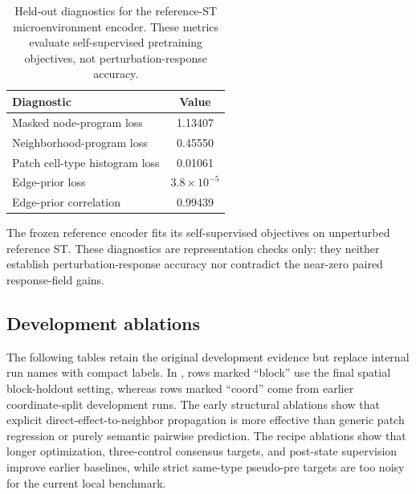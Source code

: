 \documentclass[sigconf,review,balance=false]{acmart}
\begin{document}
\begin{table}[t]
\centering
\caption{Held-out diagnostics for the reference-ST microenvironment encoder. These metrics evaluate self-supervised pretraining objectives, not perturbation-response accuracy.}
\label{tab:app_organ_prior}
\small
\setlength{\tabcolsep}{8pt}
\renewcommand{\arraystretch}{1.12}
\begin{tabular}{lc}
\toprule
Diagnostic & Value \\
\midrule
Masked node-program loss & 1.13407 \\
Neighborhood-program loss & 0.45550 \\
Patch cell-type histogram loss & 0.01061 \\
Edge-prior loss & $3.8\times10^{-5}$ \\
Edge-prior correlation & 0.99439 \\
\bottomrule
\end{tabular}
\end{table}

The frozen reference encoder fits its self-supervised objectives on
unperturbed reference ST. These diagnostics are representation checks only:
they neither establish perturbation-response accuracy nor contradict the
near-zero paired response-field gains.

\subsection{Development ablations}
\label{app:development_ablations}

The following tables retain the original development evidence but replace internal run names with compact labels. In , rows marked ``block'' use the final spatial block-holdout setting, whereas rows marked ``coord'' come from earlier coordinate-split development runs. The early structural ablations show that explicit direct-effect-to-neighbor propagation is more effective than generic patch regression or purely semantic pairwise prediction. The recipe ablations show that longer optimization, three-control consensus targets, and post-state supervision improve earlier baselines, while strict same-type pseudo-pre targets are too noisy for the current local benchmark.
\end{document}
